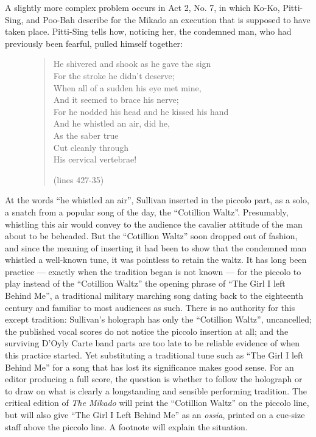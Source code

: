 \begin{paper}
A slightly more complex problem occurs in Act 2, No. 7, in which Ko-Ko,
Pitti-Sing, and Poo-Bah describe for the Mikado an execution that is
supposed to have taken place. Pitti-Sing tells how, noticing her, the
condemned man, who had previously been fearful, pulled himself together:

\begin{figure}[H]
\begin{quote}
He shivered and shook as he gave the sign \\
For the stroke he didn't deserve;\\
When all of a sudden his eye met mine,\\
And it seemed to brace his nerve;\\
For he nodded his head and he kissed his hand\\
And he whistled an air, did he,\\
As the saber true\\
Cut cleanly through\\
\-\hspace{.5cm}His cervical vertebrae!
    \begin{flushright}(lines 427-35)\end{flushright}
\end{quote}
\end{figure}

\noindent At the words ``he whistled an air'', Sullivan inserted in the piccolo
part, as a solo, a snatch from a popular song of the day, the
``Cotillion Waltz''. Presumably, whistling this air would convey to the
audience the cavalier attitude of the man about to be beheaded. But the
``Cotillion Waltz'' soon dropped out of fashion, and since the meaning
of inserting it had been to show that the condemned man whistled a
well-known tune, it was pointless to retain the waltz. It has long been
practice --- exactly when the tradition began is not known --- for the
piccolo to play instead of the ``Cotillion Waltz'' the opening phrase of
``The Girl I left Behind Me'', a traditional military marching song
dating back to the eighteenth century and familiar to most audiences as
such. There is no authority for this except tradition: Sullivan's
holograph \citep{sullivan_mikado_1885} has only the ``Cotillion Waltz'', uncancelled;
the published vocal scores do not notice the piccolo insertion at all;
and the surviving D'Oyly Carte band parts are too late to be reliable
evidence of when this practice started. Yet substituting a traditional
tune such as ``The Girl I left Behind Me'' for a song that has lost its
significance makes good sense. For an editor producing a full score, the
question is whether to follow the holograph or to draw on what is
clearly a longstanding and sensible performing tradition. The critical
edition of \emph{The Mikado} will print the ``Cotillion Waltz'' on the
piccolo line, but will also give ``The Girl I Left Behind Me'' as an
\emph{ossia}, printed on a cue-size staff above the piccolo line. A
footnote will explain the situation.


\end{paper}
